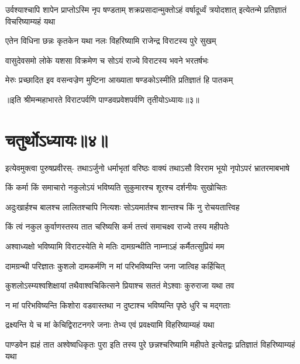 \threelineshloka
{उर्वश्याश्चापि शापेन प्राप्तोऽस्मि नृप षण्डताम्}
{शक्रप्रसादान्मुक्तोऽहं वर्षादूर्ध्वं त्रयोदशात्}
{इत्येतन्मे प्रतिज्ञातं विचरिष्याम्यहं यथा}


\twolineshloka
{एतेन विधिना छन्नः कृतकेन यथा नलः}
{विहरिष्यामि राजेन्द्र विराटस्य पुरे सुखम्}




\twolineshloka
{वासुदेवसमो लोके यशसा विक्रमेण च}
{सोऽयं राज्ये विराटस्य भवने भरतर्षभः}


\twolineshloka
{मेरुः प्रच्छादित इव वसन्वज्रेण मुष्टिना}
{आख्याता षण्डकोऽस्मीति प्रतिज्ञातं हि पातकम्}

॥इति श्रीमन्महाभारते विराटपर्वणि पाण्डवप्रवेशपर्वणि तृतीयोऽध्यायः॥३॥

\chapter{चतुर्थोऽध्यायः॥४॥}

\fourlineindentedshloka
{इत्येवमुक्त्वा पुरुषप्रवीरस्-}
{तथाऽर्जुनो धर्माभृतां वरिष्ठः}
{वाक्यं तथाऽसौ विरराम भूयो}
{नृपोऽपरं भ्रातरमाबभाषे}


\twolineshloka
{किं कर्मा किं समाचारो नकुलोऽयं भविष्यति}
{सुकुमारश्च शूरश्च दर्शनीयः सुखोचितः}


\twolineshloka
{अदुःखार्हश्च बालश्च लालितश्चापि नित्यशः}
{सोऽयमार्तश्च शान्तश्च किं नु रोचयतात्त्विह}


\twolineshloka
{किं त्वं नकुल कुर्वाणस्तस्य तात चरिष्यसि}
{कर्म तत्त्वं समाचक्ष्व राज्ये तस्य महीपतेः}




\twolineshloka
{अश्वाध्यक्षो भविष्यामि विराटस्येति मे मतिः}
{दामग्रन्थीति नाम्नाऽहं कर्मैतत्सुप्रियं मम}


\twolineshloka
{दामग्रन्थी परिज्ञातः कुशलो दामकर्मणि}
{न मां परिभविष्यन्ति जना जात्विह कर्हिचित्}


\twolineshloka
{कुशलोऽस्म्यश्वशिक्षायां तथैवाश्वचिकित्सने}
{प्रियाश्च सततं मेऽश्वाः कुरुराजा यथा तव}


\twolineshloka
{न मां परिभविष्यन्ति किशोरा वडवास्तथा}
{न दुष्टाश्च भविष्यन्ति पृष्ठे धुरि च मद्गताः}


\twolineshloka
{द्रक्ष्यन्ति ये च मां केचिद्विराटनगरे जनाः}
{तेभ्य एवं प्रवक्ष्यामि विहरिष्याम्यहं यथा}


\threelineshloka
{पाण्डवेन ह्यहं तात अश्वेष्वधिकृतः पुरा}
{इति तस्य पुरे छन्नश्चरिष्यामि महीपते}
{इत्येतद्वः प्रतिज्ञातं विहरिष्याम्यहं यथा}


